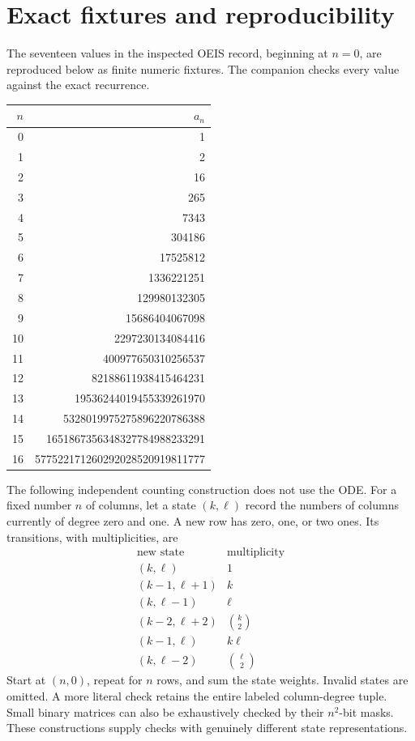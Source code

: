 \documentclass[11pt,letterpaper]{article}
\numberwithin{equation}{section}
\theoremstyle{remark}\newtheorem{remark}[theorem]{Remark}
\begin{document}
\section{Exact fixtures and reproducibility}\label{sbm:sec:checks}
The seventeen values in the inspected OEIS record, beginning at $n=0$,
are reproduced below as finite numeric fixtures. The companion checks
every value against the exact recurrence.
\begin{center}\small
\begin{tabular}{r r}
\toprule $n$ & $a_n$\\\midrule
0&1\\1&2\\2&16\\3&265\\4&7343\\5&304186\\6&17525812\\
7&1336221251\\8&129980132305\\9&15686404067098\\
10&2297230134084416\\11&400977650310256537\\
12&82188611938415464231\\13&19536244019455339261970\\
14&5328019975275896220786388\\
15&1651867356348327784988233291\\
16&577522171260292028520919811777\\\bottomrule
\end{tabular}
\end{center}
The following independent counting construction does not use the ODE.
For a fixed number $n$ of columns, let a state $(k,\ell)$ record the
numbers of columns currently of degree zero and one. A new row has
zero, one, or two ones. Its transitions, with multiplicities, are
\[
\begin{array}{c|c}
\text{new state}&\text{multiplicity}\\\hline
(k,\ell)&1\\
(k-1,\ell+1)&k\\
(k,\ell-1)&\ell\\
(k-2,\ell+2)&\binom{k}{2}\\
(k-1,\ell)&k\ell\\
(k,\ell-2)&\binom{\ell}{2}
\end{array}
\]
Start at $(n,0)$, repeat for $n$ rows, and sum the state weights.
Invalid states are omitted. A more literal check retains the entire
labeled column-degree tuple. Small binary matrices can also be
exhaustively checked by their $n^2$-bit masks. These constructions
supply checks with genuinely different state representations.
\end{document}
